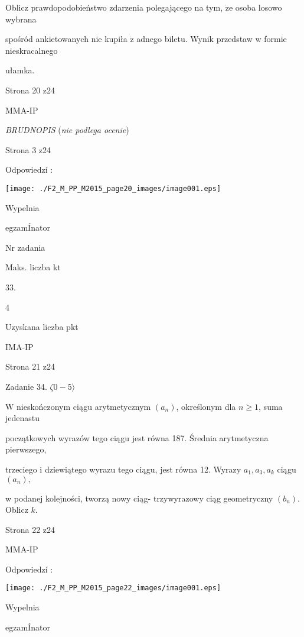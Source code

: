 \documentclass[a4paper,12pt]{article}
\begin{document}
Oblicz prawdopodobieństwo zdarzenia polegającego na tym, $\dot{\mathrm{z}}\mathrm{e}$ osoba losowo wybrana

spośród ankietowanych nie kupiła $\dot{\mathrm{z}}$ adnego biletu. Wynik przedstaw w formie nieskracalnego

ułamka.

Strona 20 z24

MMA-IP





{\it BRUDNOPIS} ({\it nie podlega ocenie})

Strona 3 z24





Odpowiedzí :
\begin{center}
\texttt{[image: ./F2\_M\_PP\_M2015\_page20\_images/image001.eps]}
\end{center}
Wypelnia

egzamÍnator

Nr zadania

Maks. liczba kt

33.

4

Uzyskana liczba pkt

IMA-IP

Strona 21 z24





Zadanie 34. $\zeta 0-5\rangle$

$\mathrm{W}$ nieskończonym ciągu arytmetycznym $(a_{n})$, określonym dla $n\geq 1$, suma jedenastu

początkowych wyrazów tego ciągu jest równa 187. Średnia arytmetyczna pierwszego,

trzeciego i dziewiątego wyrazu tego ciągu, jest równa 12. Wyrazy $a_{1}, a_{3}, a_{k}$ ciągu $(a_{n}),$

w podanej kolejności, tworzą nowy ciąg- trzywyrazowy ciąg geometryczny $(b_{n})$. Oblicz $k.$

Strona 22 z24

MMA-IP





Odpowiedzí :
\begin{center}
\texttt{[image: ./F2\_M\_PP\_M2015\_page22\_images/image001.eps]}
\end{center}
Wypelnia

egzamÍnator
\end{document}

